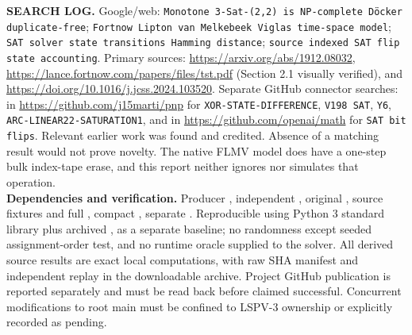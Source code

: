 \documentclass[11pt]{article}
\begin{document}
\noindent\textbf{SEARCH LOG.} Google/web: \texttt{Monotone 3-Sat-(2,2) is NP-complete D\"ocker duplicate-free}; \texttt{Fortnow Lipton van Melkebeek Viglas time-space model}; \texttt{SAT solver state transitions Hamming distance}; \texttt{source indexed SAT flip state accounting}. Primary sources: \url{https://arxiv.org/abs/1912.08032}, \url{https://lance.fortnow.com/papers/files/tst.pdf} (Section 2.1 visually verified), and \url{https://doi.org/10.1016/j.jcss.2024.103520}. Separate GitHub connector searches: in \url{https://github.com/j15marti/pnp} for \texttt{XOR-STATE-DIFFERENCE}, \texttt{V198 SAT}, \texttt{Y6}, \texttt{ARC-LINEAR22-SATURATION1}, and in \url{https://github.com/openai/math} for \texttt{SAT bit flips}. Relevant earlier work was found and credited. Absence of a matching result would not prove novelty. The native FLMV model does have a one-step bulk index-tape erase, and this report neither ignores nor simulates that operation.\\
\noindent\textbf{Dependencies and verification.} Producer , independent , original , source fixtures and full , compact , separate . Reproducible using Python 3 standard library plus archived ,  as a separate baseline; no randomness except seeded assignment-order test, and no runtime oracle supplied to the solver. All derived source results are exact local computations, with raw SHA manifest and independent replay in the downloadable archive. Project GitHub publication is reported separately and must be read back before claimed successful. Concurrent modifications to root main must be confined to LSPV-3 ownership or explicitly recorded as pending.
\end{document}
